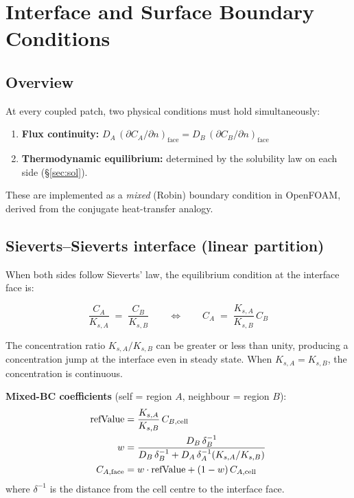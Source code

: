 \documentclass[11pt,a4paper]{article}
\begin{document}
\section{Interface and Surface Boundary Conditions}
\label{sec:bc}

\subsection{Overview}

At every coupled patch, two physical conditions must hold simultaneously:

\begin{enumerate}[itemsep=2pt]
  \item \textbf{Flux continuity:}
        $D_A\,(\partial C_A/\partial n)_\text{face} =
         D_B\,(\partial C_B/\partial n)_\text{face}$
  \item \textbf{Thermodynamic equilibrium:} determined by the solubility
        law on each side (§\ref{sec:sol}).
\end{enumerate}

These are implemented as a \emph{mixed} (Robin) boundary condition in
OpenFOAM, derived from the conjugate heat-transfer analogy.

\subsection{Sieverts--Sieverts interface (linear partition)}
\label{sec:bc_linear}

When both sides follow Sieverts' law, the equilibrium condition at the
interface face is:

\begin{tcolorbox}[eqbox,title={Sieverts--Sieverts partition (\texttt{partition linear})}]
\begin{equation}\label{eq:linear_part}
  \frac{C_A}{K_{s,A}} \;=\; \frac{C_B}{K_{s,B}}
  \qquad\Longleftrightarrow\qquad
  C_A \;=\; \frac{K_{s,A}}{K_{s,B}}\,C_B
\end{equation}
\end{tcolorbox}

The concentration ratio $K_{s,A}/K_{s,B}$ can be greater or less than unity,
producing a concentration jump at the interface even in steady state.  When
$K_{s,A} = K_{s,B}$, the concentration is continuous.

\textbf{Mixed-BC coefficients} (self = region $A$, neighbour = region $B$):
\begin{align}
  \text{refValue} &= \frac{K_{s,A}}{K_{s,B}}\,C_{B,\text{cell}} \notag\\
  w &= \frac{D_B\,\delta_B^{-1}}{D_B\,\delta_B^{-1} + D_A\,\delta_A^{-1}(K_{s,A}/K_{s,B})} \label{eq:weight_linear}\\
  C_{A,\text{face}} &= w\cdot\text{refValue} + (1-w)\,C_{A,\text{cell}} \notag
\end{align}
where $\delta^{-1}$ is the distance from the cell centre to the interface face.
\end{document}
